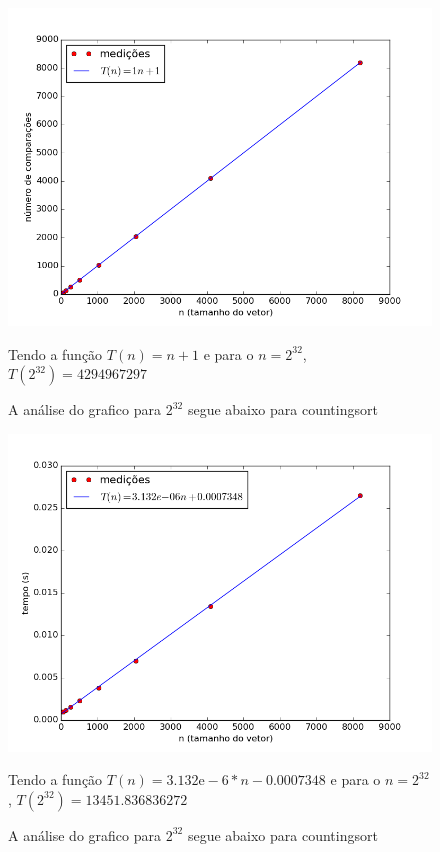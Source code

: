 \documentclass[12pt,a4paper,twoside]{report}
\begin{document}
\begin{figure}[ht]
\centering \includegraphics[scale=0.8]{../countingsort/imagens/countingsortQuaseDecresc401.png}
\caption{A análise do grafico para $2^{32}$ segue abaixo para countingsort}

Tendo a função $T(n) = n+1$ e para o $n =2^{32}$, $T(2^{32}) = 4294967297$ 
\label{fig:countingsortQuaseDecresc401}
\end{figure}




\begin{figure}[ht]
\centering \includegraphics[scale=0.8]{../countingsort/imagens/countingsortQuaseDecresc500.png}
\caption{A análise do grafico para $2^{32}$ segue abaixo para countingsort}

Tendo a função $T(n) = 3.132\mathrm{e}-6*n-0.0007348$ e para o $n =2^{32}$, $T(2^{32}) = 13451.836836272$ 
\label{fig:countingsortQuaseDecresc500}
\end{figure}
\end{document}

